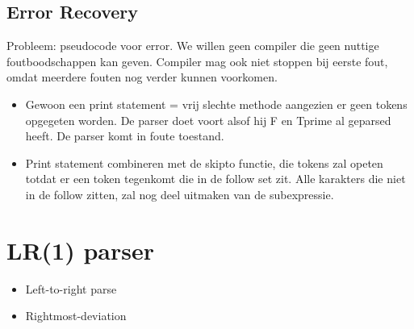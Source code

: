 \subsection{Error Recovery}
Probleem: pseudocode voor error. We willen geen compiler die geen nuttige foutboodschappen kan geven. Compiler mag ook niet stoppen bij eerste fout, omdat meerdere fouten nog verder kunnen voorkomen.
\begin{itemize}
	\item Gewoon een print statement = vrij slechte methode aangezien er geen tokens opgegeten worden. De parser doet voort alsof hij F en Tprime al geparsed heeft. De parser komt in foute toestand.
	\item Print statement combineren met de skipto functie, die tokens zal opeten totdat er een token tegenkomt die in de follow set zit. Alle karakters die niet in de follow zitten, zal nog deel uitmaken van de subexpressie. 
\end{itemize}

\section{LR(1) parser}
\begin{itemize}
	\item Left-to-right parse
	\item Rightmost-deviation
\end{itemize}